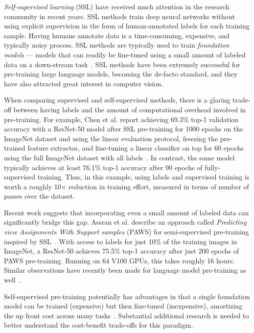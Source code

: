 
\emph{Self-supervised learning} (SSL) have received much attention in the research community in recent years. SSL methods train deep neural networks without using explicit supervision in the form of human-annotated labels for each training sample. Having humans annotate data is a time-consuming, expensive, and typically noisy process. SSL methods are typically used to train \emph{foundation models} --- models that can readily be fine-tuned using a small amount of labeled data on a down-stream task~\cite{bommasani2021opportunities}. SSL methods have been extremely successful for pre-training large language models, becoming the de-facto standard, and they have also attracted great interest in computer vision.

When comparing supervised and self-supervised methods, there is a glaring trade-off between having labels and the amount of computational overhead involved in pre-training. For example, Chen et al. report achieving 69.3\% top-1 validation accuracy with a ResNet-50 model after SSL pre-training for 1000 epochs on the ImageNet dataset and using the linear evaluation protocol, freezing the pre-trained feature extractor, and fine-tuning a linear classifier on top for 60 epochs using the full ImageNet dataset with all labels~\cite{chen2020simple}. In contrast, the same model typically achieves at least 76.1\% top-1 accuracy after 90 epochs of fully-supervised training. Thus, in this example, using labels and supervised training is worth a roughly 10$\times$ reduction in training effort, measured in terms of number of passes over the dataset.

Recent work suggests that incorporating even a small amount of labeled data can significantly bridge this gap. Assran et al. describe an approach called \emph{Predicting view Assignments With Support samples} (PAWS) for semi-supervised pre-training inspired by SSL~\cite{assran2021semi}. With access to labels for just 10\% of the training images in ImageNet, a ResNet-50 achieves 75.5\% top-1 accuracy after just 200 epochs of PAWS pre-training. Running on 64 V100 GPUs, this takes roughly 16 hours. Similar observations have recently been made for language model pre-training as well~\cite{dery2021should}.

Self-supervised pre-training potentially has advantages in that a single foundation model can be trained (expensive) but then fine-tuned (inexpensive), amortizing the up front cost across many tasks~\cite{bommasani2021opportunities}. Substantial additional research is needed to better understand the cost-benefit trade-offs for this paradigm.
